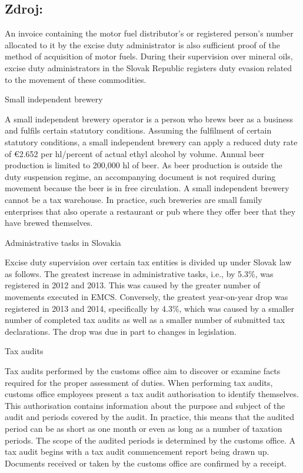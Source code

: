 \documentclass[10pt]{article}
\begin{document}
\subsection*{Zdroj:}

An invoice containing the motor fuel distributor’s or registered person’s number allocated to it by the excise duty administrator is also sufficient proof of the method of acquisition of motor fuels.
During their supervision over mineral oils, excise duty administrators in the Slovak Republic registers duty evasion related to the movement of these commodities.


Small independent brewery

A small independent brewery operator is a person who brews beer as a business and fulfils certain statutory conditions.
Assuming the fulfilment of certain statutory conditions, a small independent brewery can apply a reduced duty rate of €2.652 per hl/percent of actual ethyl alcohol by volume.
Annual beer production is limited to 200,000 hl of beer.
As beer production is outside the duty suspension regime, an accompanying document is not required during movement because the beer is in free circulation.
A small independent brewery cannot be a tax warehouse.
In practice, such breweries are small family enterprises that also operate a restaurant or pub where they offer beer that they have brewed themselves.


Administrative tasks in Slovakia

Excise duty supervision over certain tax entities is divided up under Slovak law as follows.
The greatest increase in administrative tasks, i.e., by 5.3\%, was registered in 2012 and 2013. This was caused by the greater number of movements executed in EMCS.
Conversely, the greatest year-on-year drop was registered in 2013 and 2014, specifically by 4.3\%, which was caused by a smaller number of completed tax audits as well as a smaller number of submitted tax declarations.
The drop was due in part to changes in legislation.


Tax audits

Tax audits performed by the customs office aim to discover or examine facts required for the proper assessment of duties.
When performing tax audits, customs office employees present a tax audit authorisation to identify themselves. This authorisation contains information about the purpose and subject of the audit and periods covered by the audit.
In practice, this means that the audited period can be as short as one month or even as long as a number of taxation periods.
The scope of the audited periods is determined by the customs office.
A tax audit begins with a tax audit commencement report being drawn up.
Documents received or taken by the customs office are confirmed by a receipt.
\end{document}
